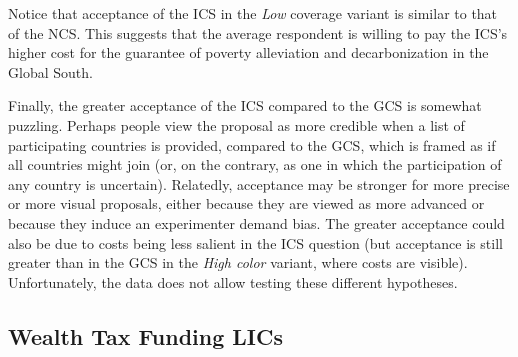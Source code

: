 \documentclass[12pt,english]{article}
\begin{document}
\begin{bibunit}
Notice that acceptance of the ICS in the \textit{Low} coverage variant is similar to that of the NCS. This suggests that the average respondent is willing to pay the ICS's higher cost for the guarantee of poverty alleviation and decarbonization in the Global South. %

Finally, the greater acceptance of the ICS compared to the GCS is somewhat puzzling. Perhaps people view the proposal as more credible when a list of participating countries is provided, compared to the GCS, which is framed as if all countries might join (or, on the contrary, as one in which the participation of any country is uncertain). Relatedly, acceptance may be stronger for more precise or more visual proposals, either because they are viewed as more advanced or because they induce an experimenter demand bias. The greater acceptance could also be due to costs being less salient in the ICS question (but acceptance is still greater than in the GCS in the \textit{High color} variant, where costs are visible). Unfortunately, the data does not allow testing these different hypotheses. %


\subsection{Wealth Tax Funding LICs}\label{subsec:wealth_tax}


\end{bibunit}
\end{document}
